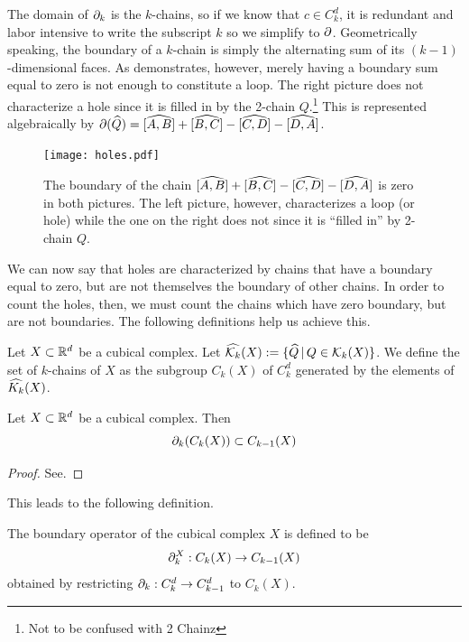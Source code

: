 The domain of $\partial_k$ is the $k$-chains, so if we know that $c \in C_k^d$, it is redundant and labor intensive to write the subscript $k$ so we simplify to $\partial$. Geometrically speaking, the boundary of a $k$-chain is simply the alternating sum of its $(k-1)$-dimensional faces. As  demonstrates, however, merely having a boundary sum equal to zero is not enough to constitute a loop. The right picture does not characterize a hole since it is filled in by the 2-chain $Q$.\footnote{Not to be confused with 2 Chainz} This is represented algebraically by $\partial (\widehat{Q}) = [\widehat{A, B}] + [\widehat{B, C}] - [\widehat{C, D}] - [\widehat{D, A}]$.

\begin{figure}[h]
\begin{center}
\texttt{[image: holes.pdf]}
\caption{\label{fig:holes} The boundary of the chain $[\widehat{A, B}] + [\widehat{B, C}] - [\widehat{C, D}] - [\widehat{D, A}]$ is zero in both pictures. The left picture, however, characterizes a loop (or hole) while the one on the right does not since it is ``filled in'' by 2-chain $Q$. }
\end{center}
\end{figure}

We can now say that holes are characterized by chains that have a boundary equal to zero, but are not themselves the boundary of other chains. In order to count the holes, then, we must count the chains which have zero boundary, but are not boundaries. The following definitions help us achieve this.

\begin{defn}
	Let $X \subset \mathbb{R}^d$ be a cubical complex. Let $\widehat{\mathcal{K}_k}(X) := \{ \widehat{Q} \, | \, Q \in \mathcal{K}_k(X) \}$. We define the set of $k$-chains of $X$ as the subgroup $C_k(X)$ of $C_k^d$ generated by the elements of $\widehat{K_k}(X)$.
\end{defn}

\begin{prop}
	Let $X \subset \mathbb{R}^d$ be a cubical complex. Then
	$$ \partial_k (C_k(X)) \subset C_{k-1}(X) $$
\end{prop}

\begin{proof}
	See.
\end{proof}

This leads to the following definition.

\begin{defn}
	The boundary operator of the cubical complex $X$ is defined to be
	$$ \partial_k^X : C_k(X) \rightarrow C_{k-1}(X) $$
	obtained by restricting $\partial_k : C_k^d \rightarrow C_{k-1}^d$ to $C_k(X)$.
\end{defn}

